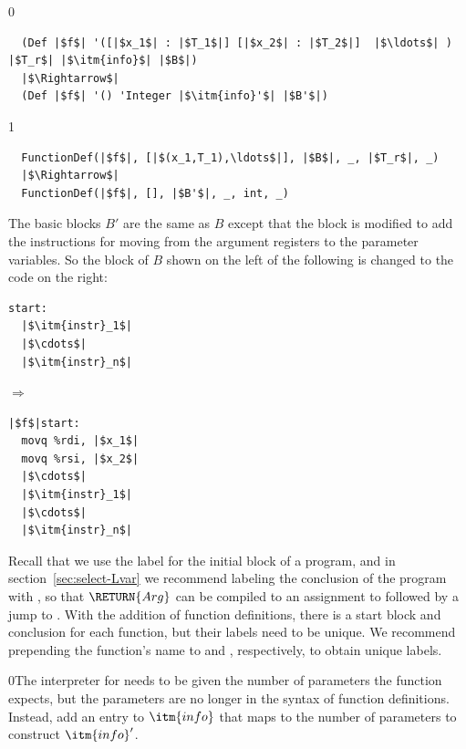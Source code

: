 \documentclass[7x10]{TimesAPriori_MIT}%
\def\racketEd{0}
\def\pythonEd{1}
\def\edition{1}
\newcommand{\racket}[1]{{\if\edition\racketEd{#1}\fi}}
\newcommand{\pythonColor}[0]{}
\numberwithin{theorem}{chapter}
\numberwithin{definition}{chapter}
\numberwithin{equation}{chapter}
\begin{document}
{\if\edition\racketEd
\begin{lstlisting}
  (Def |$f$| '([|$x_1$| : |$T_1$|] [|$x_2$| : |$T_2$|]  |$\ldots$| ) |$T_r$| |$\itm{info}$| |$B$|)
  |$\Rightarrow$|
  (Def |$f$| '() 'Integer |$\itm{info}'$| |$B'$|)
\end{lstlisting}
\fi}
{\if\edition\pythonEd\pythonColor
\begin{lstlisting}
  FunctionDef(|$f$|, [|$(x_1,T_1),\ldots$|], |$B$|, _, |$T_r$|, _)
  |$\Rightarrow$|
  FunctionDef(|$f$|, [], |$B'$|, _, int, _)
\end{lstlisting}
\fi}
The basic blocks $B'$ are the same as $B$ except that the
 block is modified to add the instructions for moving from
the argument registers to the parameter variables. So the 
block of $B$ shown on the left of the following is changed to the code
on the right:
\begin{center}
\begin{minipage}{0.3\textwidth}
\begin{lstlisting}
start:
  |$\itm{instr}_1$|
  |$\cdots$|
  |$\itm{instr}_n$|
\end{lstlisting}
\end{minipage}
$\Rightarrow$
\begin{minipage}{0.3\textwidth}
\begin{lstlisting}
|$f$|start:
  movq %rdi, |$x_1$|
  movq %rsi, |$x_2$|
  |$\cdots$|
  |$\itm{instr}_1$|
  |$\cdots$|
  |$\itm{instr}_n$|
\end{lstlisting}
\end{minipage}
\end{center}
Recall that we use the label  for the initial block of a
program, and in section~\ref{sec:select-Lvar} we recommend labeling
the conclusion of the program with , so that
$\RETURN{Arg}$ can be compiled to an assignment to  followed
by a jump to . With the addition of function
definitions, there is a start block and conclusion for each function,
but their labels need to be unique. We recommend prepending the
function's name to  and , respectively,
to obtain unique labels.

\racket{The interpreter for \LangXIndCall{} needs to be given the
  number of parameters the function expects, but the parameters are no
  longer in the syntax of function definitions. Instead, add an entry
  to $\itm{info}$ that maps \code{num-params} to the number of
  parameters to construct $\itm{info}'$.}
\end{document}
